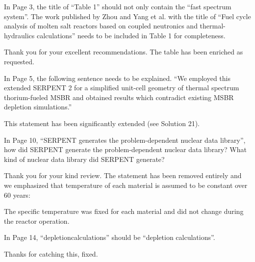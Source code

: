 \documentclass[answers,11pt]{exam}
\begin{document}
\begin{questions}
        \question  In Page 3, the title of ``Table 1'' should not only contain 
        the ``fast spectrum system''. The work published by Zhou and Yang et al. 
        with the title of ``Fuel cycle analysis of molten salt reactors based on 
        coupled neutronics and thermal-hydraulics calculations'' needs to be 
        included in Table 1 for completeness.
        \begin{solution}
                Thank you for your excellent recommendations. The table has been 
                enriched as requested.
        \end{solution}

        \question  In Page 5, the following sentence needs to be explained. ``We 
        employed this extended SERPENT 2 for a simplified unit-cell geometry of 
        thermal spectrum thorium-fueled MSBR and obtained results which 
        contradict existing MSBR depletion simulations.''
        \begin{solution}
                This statement has been significantly extended (see Solution 21).
        \end{solution}

        \question  In Page 10, ``SERPENT generates the problem-dependent nuclear 
        data library'', how did SERPENT generate the problem-dependent nuclear 
        data library? What kind of nuclear data library did SERPENT generate?
        \begin{solution}
                Thank you for your kind review. The statement has been removed
		        entirely and we emphasized that temperature of each material is 
		        assumed to be constant over 60 years:
		        
		        The specific temperature was fixed for each material and did 
		        not change during the reactor operation. 
        \end{solution}

        \question  In Page 14, ``depletioncalculations'' should be ``depletion 
        calculations''.
        \begin{solution}
                Thanks for catching this, fixed.
        \end{solution}


\end{questions}
\end{document}
